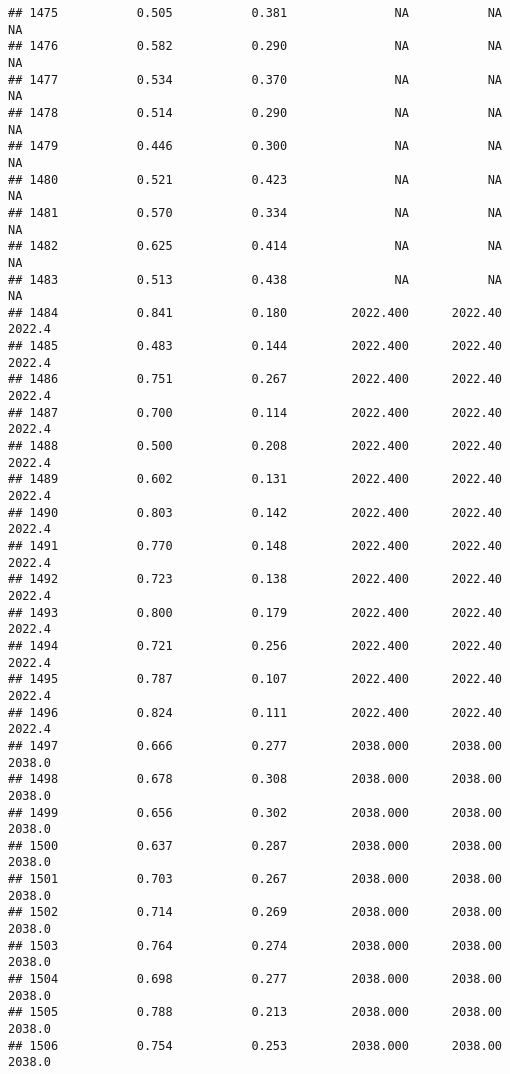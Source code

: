 \documentclass[
]{article}
\begin{document}
\begin{verbatim}
## 1475           0.505           0.381               NA           NA           NA
## 1476           0.582           0.290               NA           NA           NA
## 1477           0.534           0.370               NA           NA           NA
## 1478           0.514           0.290               NA           NA           NA
## 1479           0.446           0.300               NA           NA           NA
## 1480           0.521           0.423               NA           NA           NA
## 1481           0.570           0.334               NA           NA           NA
## 1482           0.625           0.414               NA           NA           NA
## 1483           0.513           0.438               NA           NA           NA
## 1484           0.841           0.180         2022.400      2022.40       2022.4
## 1485           0.483           0.144         2022.400      2022.40       2022.4
## 1486           0.751           0.267         2022.400      2022.40       2022.4
## 1487           0.700           0.114         2022.400      2022.40       2022.4
## 1488           0.500           0.208         2022.400      2022.40       2022.4
## 1489           0.602           0.131         2022.400      2022.40       2022.4
## 1490           0.803           0.142         2022.400      2022.40       2022.4
## 1491           0.770           0.148         2022.400      2022.40       2022.4
## 1492           0.723           0.138         2022.400      2022.40       2022.4
## 1493           0.800           0.179         2022.400      2022.40       2022.4
## 1494           0.721           0.256         2022.400      2022.40       2022.4
## 1495           0.787           0.107         2022.400      2022.40       2022.4
## 1496           0.824           0.111         2022.400      2022.40       2022.4
## 1497           0.666           0.277         2038.000      2038.00       2038.0
## 1498           0.678           0.308         2038.000      2038.00       2038.0
## 1499           0.656           0.302         2038.000      2038.00       2038.0
## 1500           0.637           0.287         2038.000      2038.00       2038.0
## 1501           0.703           0.267         2038.000      2038.00       2038.0
## 1502           0.714           0.269         2038.000      2038.00       2038.0
## 1503           0.764           0.274         2038.000      2038.00       2038.0
## 1504           0.698           0.277         2038.000      2038.00       2038.0
## 1505           0.788           0.213         2038.000      2038.00       2038.0
## 1506           0.754           0.253         2038.000      2038.00       2038.0

\end{verbatim}
\end{document}
